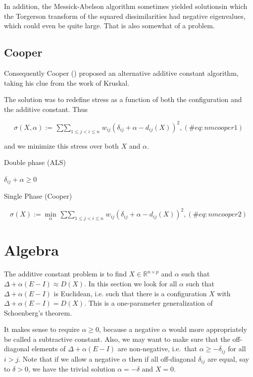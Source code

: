 \documentclass[
  12pt,
  letterpaper,
  DIV=11,
  numbers=noendperiod]{scrreprt}
\theoremstyle{remark}
\begin{document}
In addition, the Messick-Abelson algorithm sometimes yielded solutionsin
which the Torgerson transform of the squared dissimilarities had
negative eigenvalues, which could even be quite large. That is also
somewhat of a problem.

\subsection{Cooper}\label{cooper}

Consequently Cooper () proposed an
alternative additive constant algorithm, taking his clue from the work
of Kruskal.

The solution was to redefine stress as a function of both the
configuration and the additive constant. Thus

\begin{equation}
\sigma(X,\alpha):=\mathop{\sum\sum}_{1\leq j<i\leq n}w_{ij}(\delta_{ij}+\alpha-d_{ij}(X))^2,
(\#eq:nmcooper1)
\end{equation}

and we minimize this stress over both \(X\) and \(\alpha\).

Double phase (ALS)

\(\delta_{ij}+\alpha\geq 0\)

Single Phase (Cooper)

\begin{equation}
\sigma(X):=\min_\alpha\mathop{\sum\sum}_{1\leq j<i\leq n}w_{ij}(\delta_{ij}+\alpha-d_{ij}(X))^2,
(\#eq:nmcooper2)
\end{equation}

\section{Algebra}\label{exactad}

The additive constant problem is to find \(X\in\mathbb{R}^{n\times p}\)
and \(\alpha\) such that \(\Delta+\alpha(E-I)\approx D(X)\). In this
section we look for all \(\alpha\) such that \(\Delta+\alpha(E-I)\) is
Euclidean, i.e. such that there is a configuration \(X\) with
\(\Delta+\alpha(E-I)=D(X)\). This is a one-parameter generalization of
Schoenberg's theorem.

It makes sense to require \(\alpha\geq 0\), because a negative
\(\alpha\) would more appropriately be called a subtractive constant.
Also, we may want to make sure that the off-diagonal elements of
\(\Delta+\alpha(E-I)\) are non-negative, i.e.~that
\(\alpha\geq-\delta_{ij}\) for all \(i>j\). Note that if we allow a
negative \(\alpha\) then if all off-diagonal \(\delta_{ij}\) are equal,
say to \(\delta>0\), we have the trivial solution \(\alpha=-\delta\) and
\(X=0\).
\end{document}
